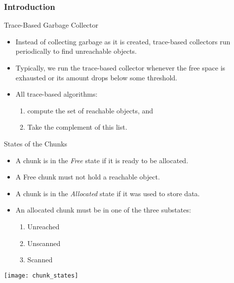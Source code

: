 \begin{bibunit}[apalike]
\subsubsection{Introduction}

\tableofcontentslide[sections={4-6},sectionstyle={show/shaded},subsectionstyle={show/shaded/hide},subsubsectionstyle={show/show/hide/hide}]

\begin{frame}{Trace-Based Garbage Collector}
	\begin{itemize}
	\item Instead of collecting garbage as it is created, trace-based collectors run periodically to find unreachable objects.
	\vfill
	\item Typically, we run the trace-based collector whenever the free space is exhausted or its amount drops below some threshold.
	\vfill
	\item All trace-based algorithms:
		\begin{enumerate}
		\item compute the set of reachable objects, and
		\item Take the complement of this list.
		\end{enumerate}
	\end{itemize}
\end{frame}

\begin{frame}{States of the Chunks}
	\begin{definition}[Free]
		\begin{itemize}
		\item A chunk is in the \emph{Free} state if it is ready to be allocated.
		\item A Free chunk must not hold a reachable object.
		\end{itemize}
	\end{definition}
	\begin{definition}[Allocated]
		\begin{itemize}
		\item A chunk is in the \emph{Allocated} state if it was used to store data.
		\item An allocated chunk must be in one of the three substates:
			\begin{enumerate}
			\item Unreached
			\item Unscanned
			\item Scanned
			\end{enumerate}
		\end{itemize}
	\end{definition}
	\begin{center}
		\texttt{[image: chunk\_states]}
	\end{center}
\end{frame}


\end{bibunit}
